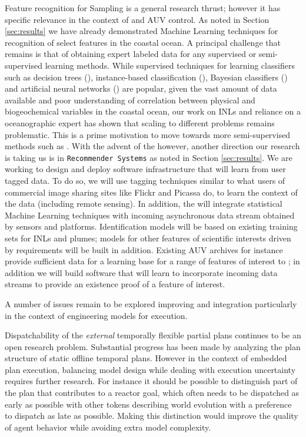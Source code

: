 Feature recognition for Sampling is a general research thrust; however
it has specific relevance in the context of \rx and AUV control. As
noted in Section \ref{sec:results} we have already demonstrated
Machine Learning techniques for recognition of select features in the
coastal ocean. A principal challenge that remains is that of obtaining
expert labeled data for any supervised or semi-supervised learning
methods.  While supervised techniques for learning classifiers such as
decision trees (\cite{Quinlan93-dtrees}), instance-based
classification (\cite{Aha-ibl-ml91}), Bayesian classifiers
(\cite{Jensen2001-BNetworks}) and artificial neural networks
(\cite{ANNsurvey-2000}) are popular, given the vast amount of data
available and poor understanding of correlation between physical and
biogeochemical variables in the coastal ocean, our work on INLs
\cite{mcgann08d,ryan10} and reliance on a oceanographic expert has
shown that scaling to different problems remains problematic. This is
a prime motivation to move towards more semi-supervised methods such
as \cite{kumar11,sergio12}. With the advent of the \od however,
another direction our research is taking us is in \texttt{Recommender
  Systems} \cite{Adomavicius05} as noted in Section
\ref{sec:results}. We are working to design and deploy software
infrastructure that will learn from user tagged data. To do so, we
will use tagging techniques similar to what users of commercial image
sharing sites like Flickr and Picassa do, to learn the context of the
data (including remote sensing). In addition, the \od will integrate
statistical Machine Learning techniques with incoming asynchronous
data stream obtained by sensors and platforms. Identification models
will be based on existing training sets for INLs and plumes; models
for other features of scientific interests driven by \can requirements
will be built in addition. Existing AUV archives for instance provide
sufficient data for a learning base for a range of features of
interest to \can; in addition we will build software that will learn
to incorporate incoming data streams to provide an existence proof of
a feature of interest.

A number of issues remain to be explored improving \rx and \eu
integration particularly in the context of engineering models for
execution.

Dispatchability of the {\em external} temporally flexible partial
plans continues to be an open research problem. Substantial progress
has been made \cite{vidal97,mus98a,tsam98,morris00} by analyzing the
plan structure of static offline temporal plans. However in the
context of embedded plan execution, balancing model design while
dealing with execution uncertainty requires further research. For
instance it should be possible to distinguish part of the plan that
contributes to a reactor goal, which often needs to be dispatched as
early as possible with other tokens describing world evolution with a
preference to dispatch as late as possible. Making this distinction
would improve the quality of agent behavior while avoiding extra model
complexity.

